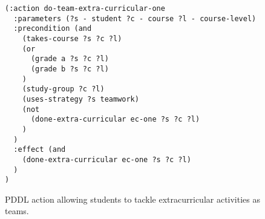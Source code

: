 \begin{figure}[t]
\begin{lstlisting}
(:action do-team-extra-curricular-one
  :parameters (?s - student ?c - course ?l - course-level)
  :precondition (and 
    (takes-course ?s ?c ?l)
    (or
      (grade a ?s ?c ?l)
      (grade b ?s ?c ?l)
    )
    (study-group ?c ?l)
    (uses-strategy ?s teamwork)
    (not
      (done-extra-curricular ec-one ?s ?c ?l)
    )
  )
  :effect (and 
    (done-extra-curricular ec-one ?s ?c ?l)
  )
)
\end{lstlisting}
\caption{PDDL action allowing students to tackle extracurricular activities as teams.}\label{fig:pddl-action-team-extra-curricular-one}
\end{figure}